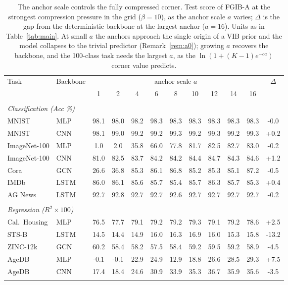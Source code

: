 \begin{table}[t]
\caption{The anchor scale controls the fully compressed corner. Test score of FGIB-A at the strongest compression pressure in the grid ($\beta=10$), as the anchor scale $a$ varies; $\Delta$ is the gap from the deterministic backbone at the largest anchor ($a{=}16$). Units as in Table~\ref{tab:main}. At small $a$ the anchors approach the single origin of a VIB prior and the model collapses to the trivial predictor (Remark~\ref{rem:a0}); growing $a$ recovers the backbone, and the 100-class task needs the largest $a$, as the $\ln(1+(K-1)e^{-ca})$ corner value predicts.}
\label{tab:anchor}
\begin{center}\small
\begin{tabular}{llccccccccc|c}
Task & Backbone & \multicolumn{9}{c|}{anchor scale $a$} & $\Delta$ \\
 & & 1 & 2 & 4 & 6 & 8 & 10 & 12 & 14 & 16 & \\ \hline \\[-1.8ex]
\multicolumn{12}{l}{\emph{Classification (Acc \%)}} \\[0.3ex]
MNIST & MLP & 98.1 & 98.0 & 98.2 & 98.3 & 98.3 & 98.3 & 98.3 & 98.3 & 98.3 & -0.0 \\
MNIST & CNN & 98.1 & 99.0 & 99.2 & 99.2 & 99.3 & 99.2 & 99.3 & 99.2 & 99.3 & +0.2 \\
ImageNet-100 & MLP & 1.0 & 2.0 & 35.8 & 66.0 & 77.8 & 81.7 & 82.5 & 82.7 & 83.0 & -0.2 \\
ImageNet-100 & CNN & 81.0 & 82.5 & 83.7 & 84.2 & 84.2 & 84.4 & 84.7 & 84.3 & 84.6 & +1.2 \\
Cora & GCN & 26.6 & 36.8 & 85.3 & 86.1 & 86.8 & 85.2 & 85.3 & 85.1 & 87.2 & -0.5 \\
IMDb & LSTM & 86.0 & 86.1 & 85.6 & 85.7 & 85.4 & 85.7 & 86.3 & 85.7 & 85.3 & +0.4 \\
AG News & LSTM & 92.7 & 92.8 & 92.7 & 92.7 & 92.6 & 92.7 & 92.7 & 92.7 & 92.7 & -0.2 \\
\\[-1.5ex]
\multicolumn{12}{l}{\emph{Regression ($R^2\times100$)}} \\[0.3ex]
Cal.\ Housing & MLP & 76.5 & 77.7 & 79.1 & 79.2 & 79.2 & 79.3 & 79.1 & 79.2 & 78.6 & +2.5 \\
STS-B & LSTM & 14.5 & 14.4 & 14.9 & 16.0 & 16.3 & 16.9 & 16.0 & 15.3 & 15.8 & -13.2 \\
ZINC-12k & GCN & 60.2 & 58.4 & 58.2 & 57.5 & 58.4 & 59.2 & 59.5 & 59.2 & 58.9 & -4.5 \\
AgeDB & MLP & -0.1 & -0.1 & 22.9 & 24.9 & 12.9 & 18.8 & 26.6 & 28.5 & 29.3 & +7.5 \\
AgeDB & CNN & 17.4 & 18.4 & 24.6 & 30.9 & 33.9 & 35.3 & 36.7 & 35.9 & 35.6 & -3.5 \\
\\[-1.5ex]
\end{tabular}\end{center}\end{table}
